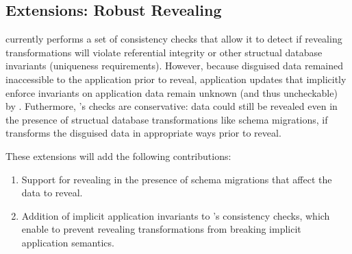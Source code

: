 \subsection{Extensions: Robust Revealing}
\sys currently performs a set of consistency checks that allow it to detect if
revealing transformations will violate referential integrity or other structual
database invariants (\eg uniqueness requirements). However, because disguised
data remained inaccessible to the application prior to reveal, application
updates that implicitly enforce invariants on application data remain unknown
(and thus uncheckable) by \sys.
%
Futhermore, \sys's checks are conservative: data could still be revealed even
in the presence of structual database transformations like schema migrations, if
\sys transforms the disguised data in appropriate ways prior to reveal.

These extensions will add the following contributions:
\begin{enumerate}[nosep]
    \item Support for revealing in the presence of schema migrations that affect
        the data to reveal.
    \item Addition of implicit application invariants to \sys's consistency
        checks, which enable \sys to prevent revealing transformations from
        breaking implicit application semantics.
\end{enumerate}
